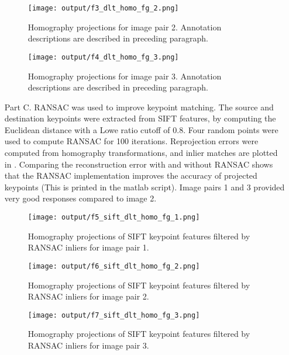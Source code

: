\documentclass[12pt]{report}
\begin{document}
\begin{enumerate}
    \begin{figure}[H]
        \centering
        \texttt{[image: output/f3\_dlt\_homo\_fg\_2.png]}
        \caption{Homography projections for image pair 2. Annotation descriptions are described in preceding paragraph.}
        \label{fig:Figure3}
    \end{figure}

    \begin{figure}[H]
        \centering
        \texttt{[image: output/f4\_dlt\_homo\_fg\_3.png]}
        \caption{Homography projections for image pair 3. Annotation descriptions are described in preceding paragraph.}
        \label{fig:Figure4}
    \end{figure}


    \item[Part C.]  RANSAC was used to improve keypoint matching. The source and destination keypoints were extracted from SIFT features, by computing the Euclidean distance with a 
    Lowe ratio cutoff of 0.8. Four random points were used to compute RANSAC for 100 iterations. Reprojection errors were computed from homography transformations, and inlier matches 
    are plotted in . Comparing the reconstruction error with and without RANSAC shows that the RANSAC implementation improves the accuracy of 
    projected keypoints (This is printed in the matlab script). Image pairs 1 and 3 provided very good responses compared to image 2.

    \begin{figure}[H]
        \centering
        \texttt{[image: output/f5\_sift\_dlt\_homo\_fg\_1.png]}
        \caption{Homography projections of SIFT keypoint features filtered by RANSAC inliers for image pair 1.}
        \label{fig:Figure5}
    \end{figure}

    \begin{figure}[H]
        \centering
        \texttt{[image: output/f6\_sift\_dlt\_homo\_fg\_2.png]}
        \caption{Homography projections of SIFT keypoint features filtered by RANSAC inliers for image pair 2.}
        \label{fig:Figure6}
    \end{figure}

    \begin{figure}[H]
        \centering
        \texttt{[image: output/f7\_sift\_dlt\_homo\_fg\_3.png]}
        \caption{Homography projections of SIFT keypoint features filtered by RANSAC inliers for image pair 3.}
        \label{fig:Figure7}
    \end{figure}


\end{enumerate}
\end{document}
